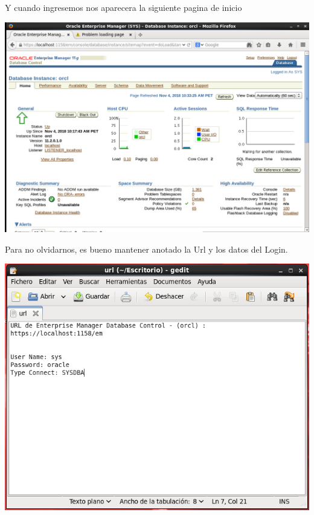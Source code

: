 Y cuando ingresemos nos aparecera la siguiente pagina de inicio
\begin{center}
	\includegraphics[width=15cm]{./Imagenes/93} 
\end{center}

Para no olvidarnos, es bueno mantener anotado la Url y los datos del Login.
\begin{center}
	\includegraphics[width=15cm]{./Imagenes/94} 
\end{center}







